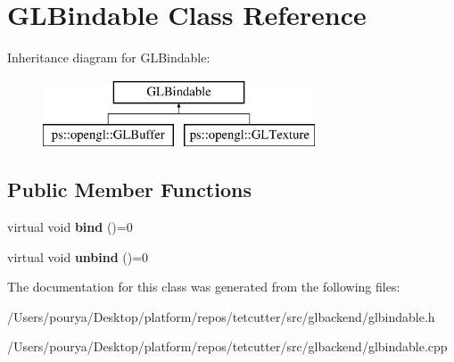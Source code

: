 \hypertarget{classGLBindable}{}\section{G\+L\+Bindable Class Reference}
\label{classGLBindable}
Inheritance diagram for G\+L\+Bindable\+:\begin{figure}[H]
\begin{center}
\leavevmode
\includegraphics[height=2.000000cm]{classGLBindable}
\end{center}
\end{figure}
\subsection*{Public Member Functions}
\begin{DoxyCompactItemize}
\item 
\hypertarget{classGLBindable_acc26216083ad493ef1ecd132ae253f2a}{}virtual void {\bfseries bind} ()=0\label{classGLBindable_acc26216083ad493ef1ecd132ae253f2a}

\item 
\hypertarget{classGLBindable_a04c033bba2c21e50ce80307ede23a5f1}{}virtual void {\bfseries unbind} ()=0\label{classGLBindable_a04c033bba2c21e50ce80307ede23a5f1}

\end{DoxyCompactItemize}


The documentation for this class was generated from the following files\+:\begin{DoxyCompactItemize}
\item 
/\+Users/pourya/\+Desktop/platform/repos/tetcutter/src/glbackend/glbindable.\+h\item 
/\+Users/pourya/\+Desktop/platform/repos/tetcutter/src/glbackend/glbindable.\+cpp\end{DoxyCompactItemize}
